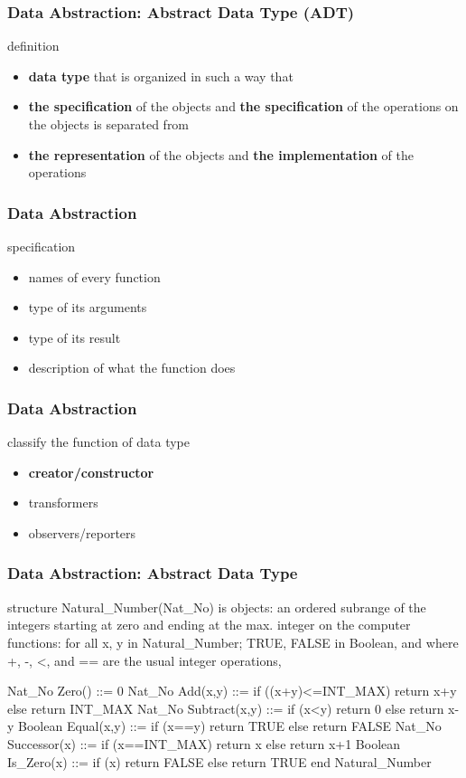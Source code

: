 \documentclass[newPxFont,sthlmFooter,nooffset]{beamer}
\begin{document}
\begin{frame}[t]
  \frametitle{Data Abstraction: Abstract Data Type (ADT)}
definition
\begin{itemize}
\item \textbf{data type} that is organized in such a way that
\item \textbf{the specification} of the objects and \textbf{the specification} of the operations on the objects is separated from
\item  \textbf{the representation} of the objects and \textbf{the implementation} of the operations
\end{itemize}


\end{frame}

\begin{frame}[t]
  \frametitle{Data Abstraction}
specification
\begin{itemize}
\item  names of every function
\item type of its arguments
\item type of its result
\item description of what the function does
\end{itemize}
\end{frame}

\begin{frame}[t]
	\frametitle{Data Abstraction}
	classify the function of data type 
	\begin{itemize}
		\item \textbf{creator/constructor}
		\item transformers
		\item observers/reporters
	\end{itemize}
\end{frame}

\begin{frame}[t, fragile]
  \frametitle{Data Abstraction: Abstract Data Type}
\begin{codedefnb}
structure Natural_Number(Nat_No) is
   objects: an ordered subrange of the integers 
            starting at zero and ending at the max. 
            integer on the computer 
   functions: for all x, y in Natural_Number; 
            TRUE, FALSE in Boolean, 
            and where +, -, <, and == are 
            the usual integer operations,

   Nat_No Zero() ::= 0
   Nat_No Add(x,y) ::= if ((x+y)<=INT_MAX) return x+y
      else return INT_MAX 
   Nat_No Subtract(x,y) ::= if (x<y) return 0
      else return x-y 
   Boolean Equal(x,y) ::= if (x==y) return TRUE
      else return FALSE 
   Nat_No Successor(x) ::= if (x==INT_MAX) return x
      else return x+1 
   Boolean Is_Zero(x) ::= if (x) return FALSE
      else return TRUE
end Natural_Number
\end{codedefnb}
\end{frame}
\end{document}
